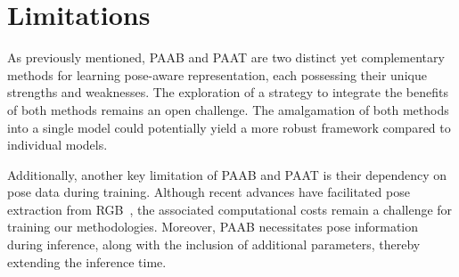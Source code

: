 \documentclass{article}
\begin{document}
\section{Limitations} 
As previously mentioned, PAAB and PAAT are two distinct yet complementary methods for learning pose-aware representation, each possessing their unique strengths and weaknesses. The exploration of a strategy to integrate the benefits of both methods remains an open challenge. The amalgamation of both methods into a single model could potentially yield a more robust framework compared to individual models. 

Additionally, another key limitation of PAAB and PAAT is their dependency on pose data during training. Although recent advances have facilitated pose extraction from RGB~\cite{OpenPose}, the associated computational costs remain a challenge for training our methodologies. Moreover, PAAB necessitates pose information during inference, along with the inclusion of additional parameters, thereby extending the inference time.
\end{document}
